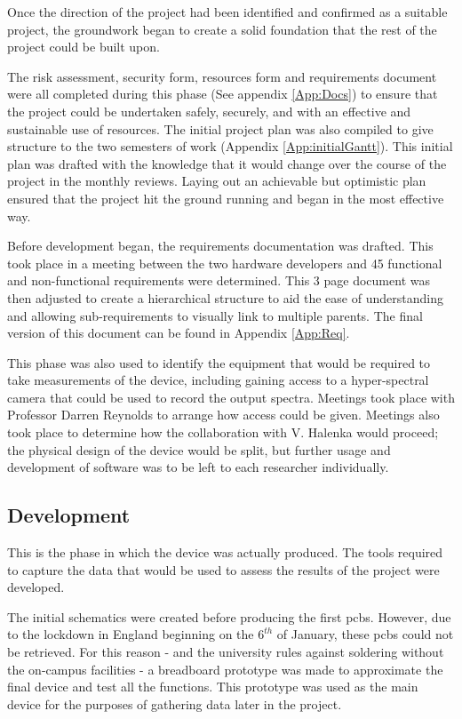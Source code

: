 Once the direction of the project had been identified and confirmed as a suitable project, the groundwork began to create a solid foundation that the rest of the project could be built upon.

The risk assessment, security form, resources form and requirements document were all completed during this phase (See appendix \ref{App:Docs}) to ensure that the project could be undertaken safely, securely, and with an effective and sustainable use of resources. The initial project plan was also compiled to give structure to the two semesters of work (Appendix \ref{App:initialGantt}). This initial plan was drafted with the knowledge that it would change over the course of the project in the monthly reviews. Laying out an achievable but optimistic plan ensured that the project hit the ground running and began in the most effective way.

Before development began, the requirements documentation was drafted. This took place in a meeting between the two hardware developers and 45 functional and non-functional requirements were determined. This 3 page document was then adjusted to create a hierarchical structure to aid the ease of understanding and allowing sub-requirements to visually link to multiple parents. The final version of this document can be found in Appendix \ref{App:Req}.

This phase was also used to identify the equipment that would be required to take measurements of the device, including gaining access to a hyper-spectral camera that could be used to record the output spectra. Meetings took place with Professor Darren Reynolds to arrange how access could be given. Meetings also took place to determine how the collaboration with V. Halenka would proceed; the physical design of the device would be split, but further usage and development of software was to be left to each researcher individually.

\subsection{Development}

This is the phase in which the device was actually produced. The tools required to capture the data that would be used to assess the results of the project were developed.

The initial schematics were created before producing the first \acrshort{pcbs}. However, due to the lockdown in England beginning on the $6^{th}$ of January, these \acrshort{pcbs} could not be retrieved. For this reason - and the university rules against soldering without the on-campus facilities - a breadboard prototype was made to approximate the final device and test all the functions. This prototype was used as the main device for the purposes of gathering data later in the project. 

